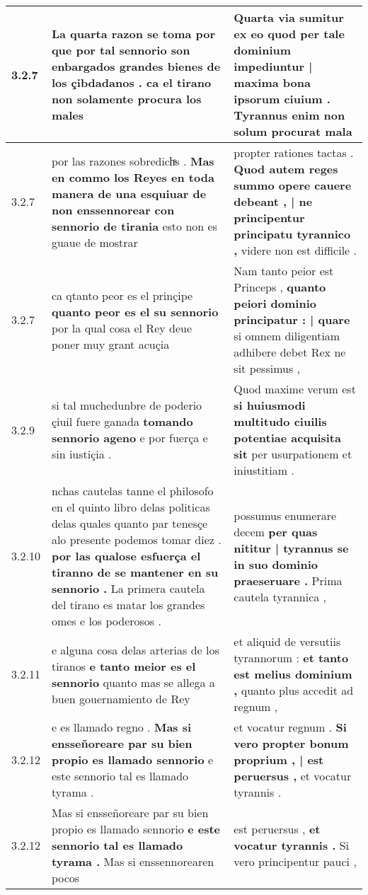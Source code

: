 \begin{tabular}{|p{1cm}|p{6.5cm}|p{6.5cm}|}
3.2.7 & La quarta razon se toma \textbf{ por que por tal sennorio son enbargados grandes bienes de los çibdadanos . } ca el tirano non solamente procura los males & Quarta via sumitur \textbf{ ex eo quod per tale dominium impediuntur | maxima bona ipsorum ciuium . } Tyrannus enim non solum procurat mala \\\hline
3.2.7 & por las razones sobredichͣs . \textbf{ Mas en commo los Reyes en toda manera de una esquiuar de non enssennorear con sennorio de tirania } esto non es guaue de mostrar & propter rationes tactas . \textbf{ Quod autem reges summo opere cauere debeant , | ne principentur principatu tyrannico , } videre non est difficile . \\\hline
3.2.7 & ca qtanto peor es el prinçipe \textbf{ quanto peor es el su sennorio } por la qual cosa el Rey deue poner muy grant acuçia & Nam tanto peior est Princeps , \textbf{ quanto peiori dominio principatur : | quare } si omnem diligentiam adhibere debet Rex ne sit pessimus , \\\hline
3.2.9 & si tal muchedunbre de poderio çiuil fuere ganada \textbf{ tomando sennorio ageno } e por fuerça e sin iustiçia . & Quod maxime verum est \textbf{ si huiusmodi multitudo ciuilis potentiae acquisita sit } per usurpationem et iniustitiam . \\\hline
3.2.10 & nchas cautelas tanne el philosofo en el quinto libro delas politicas delas quales quanto par tenesçe alo presente podemos tomar diez . \textbf{ por las qualose esfuerça el tiranno de se mantener en su sennorio . } La primera cautela del tirano es matar los grandes omes e los poderosos . & possumus enumerare decem \textbf{ per quas nititur | tyrannus se in suo dominio praeseruare . } Prima cautela tyrannica , \\\hline
3.2.11 & e alguna cosa delas arterias de los tiranos \textbf{ e tanto meior es el sennorio } quanto mas se allega a buen gouernamiento de Rey & et aliquid de versutiis tyrannorum : \textbf{ et tanto est melius dominium , } quanto plus accedit ad regnum , \\\hline
3.2.12 & e es llamado regno . \textbf{ Mas si ensseñoreare par su bien propio es llamado sennorio } e este sennorio tal es llamado tyrama . & et vocatur regnum . \textbf{ Si vero propter bonum proprium , | est peruersus , } et vocatur tyrannis . \\\hline
3.2.12 & Mas si ensseñoreare par su bien propio es llamado sennorio \textbf{ e este sennorio tal es llamado tyrama . } Mas si enssennorearen pocos & est peruersus , \textbf{ et vocatur tyrannis . } Si vero principentur pauci , \\\hline

\end{tabular}
